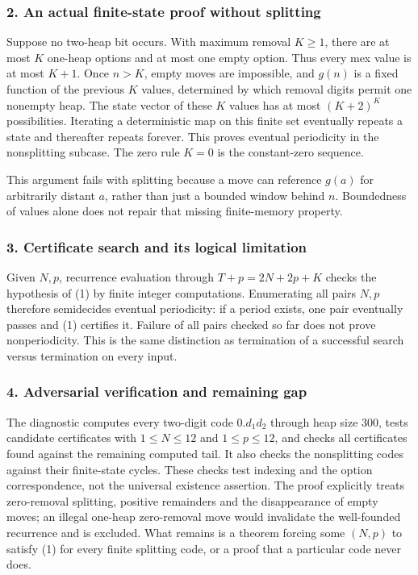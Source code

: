 \documentclass[11pt,a4paper]{article}
\begin{document}
\subsubsection{2. An actual finite-state proof without splitting}
Suppose no two-heap bit occurs. With maximum removal $K\geq1$, there are at most $K$ one-heap options and at most one empty option. Thus every mex value is at most $K+1$. Once $n>K$, empty moves are impossible, and $g(n)$ is a fixed function of the previous $K$ values, determined by which removal digits permit one nonempty heap. The state vector of these $K$ values has at most $(K+2)^K$ possibilities. Iterating a deterministic map on this finite set eventually repeats a state and thereafter repeats forever. This proves eventual periodicity in the nonsplitting subcase. The zero rule $K=0$ is the constant-zero sequence.

This argument fails with splitting because a move can reference $g(a)$ for arbitrarily distant $a$, rather than just a bounded window behind $n$. Boundedness of values alone does not repair that missing finite-memory property.

\subsubsection{3. Certificate search and its logical limitation}
Given $N,p$, recurrence evaluation through $T+p=2N+2p+K$ checks the hypothesis of (1) by finite integer computations. Enumerating all pairs $N,p$ therefore semidecides eventual periodicity: if a period exists, one pair eventually passes and (1) certifies it. Failure of all pairs checked so far does not prove nonperiodicity. This is the same distinction as termination of a successful search versus termination on every input.

\subsubsection{4. Adversarial verification and remaining gap}
The diagnostic computes every two-digit code $0.d_1d_2$ through heap size 300, tests candidate certificates with $1\leq N\leq12$ and $1\leq p\leq12$, and checks all certificates found against the remaining computed tail. It also checks the nonsplitting codes against their finite-state cycles. These checks test indexing and the option correspondence, not the universal existence assertion. The proof explicitly treats zero-removal splitting, positive remainders and the disappearance of empty moves; an illegal one-heap zero-removal move would invalidate the well-founded recurrence and is excluded. What remains is a theorem forcing some $(N,p)$ to satisfy (1) for every finite splitting code, or a proof that a particular code never does.
\end{document}
